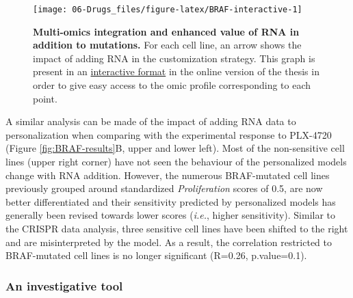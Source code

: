 \documentclass[a4paper,12pt,twoside,onecolumn,openright,final,oldfontcommands]{memoir}
\begin{document}
\begin{figure}

{\centering \texttt{[image: 06-Drugs\_files/figure-latex/BRAF-interactive-1]} 

}

\caption[Multi-omics integration and enhanced value of RNA in addition to mutations]{\textbf{Multi-omics integration and
enhanced value of RNA in addition to mutations.} For each cell line, an
arrow shows the impact of adding RNA in the customization strategy. This
graph is present in an
\href{https://jonasbeal.github.io/files/PhdThesis/personalized-logical-models-to-study-an-interpret-drug-response.html\#fig:BRAF-interactive}{interactive
format} in the online version of the thesis in order to give easy access
to the omic profile corresponding to each point.}\label{fig:BRAF-interactive}
\end{figure}









A similar analysis can be made of the impact of adding RNA data to
personalization when comparing with the experimental response to
PLX-4720 (Figure \ref{fig:BRAF-results}B, upper and lower left). Most of
the non-sensitive cell lines (upper right corner) have not seen the
behaviour of the personalized models change with RNA addition. However,
the numerous BRAF-mutated cell lines previously grouped around
standardized \emph{Proliferation} scores of 0.5, are now better
differentiated and their sensitivity predicted by personalized models
has generally been revised towards lower scores (\emph{i.e.}, higher
sensitivity). Similar to the CRISPR data analysis, three sensitive cell
lines have been shifted to the right and are misinterpreted by the
model. As a result, the correlation restricted to BRAF-mutated cell
lines is no longer significant (R=0.26, p.value=0.1).

\subsubsection{An investigative tool}\label{an-investigative-tool}
\end{document}
